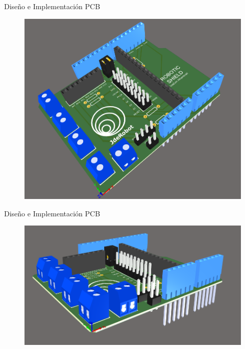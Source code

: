 \documentclass{beamer}
\begin{document}
\begin{frame}{Diseño e Implementación PCB}
		\begin{figure}[H]
	\center
	\includegraphics[scale=0.40]{imagenes/Balancing_Robot/Vista3D1.PNG}
\end{figure}
\end{frame}

\begin{frame}{Diseño e Implementación PCB}
	\begin{center}
	\begin{figure}[H]
		\center
		\includegraphics[scale=0.5]{imagenes/Balancing_Robot/Vista3D2.PNG}
	\end{figure}
\end{center}
\end{frame}
\end{document}
